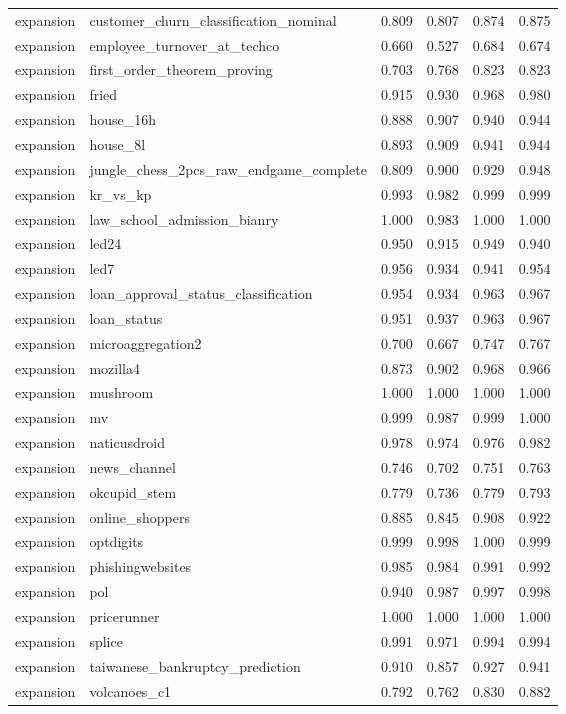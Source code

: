 \begin{longtable}{llrrrr}
expansion & customer\_churn\_classification\_nominal & 0.809 & 0.807 & 0.874 & 0.875 \\
expansion & employee\_turnover\_at\_techco & 0.660 & 0.527 & 0.684 & 0.674 \\
expansion & first\_order\_theorem\_proving & 0.703 & 0.768 & 0.823 & 0.823 \\
expansion & fried & 0.915 & 0.930 & 0.968 & 0.980 \\
expansion & house\_16h & 0.888 & 0.907 & 0.940 & 0.944 \\
expansion & house\_8l & 0.893 & 0.909 & 0.941 & 0.944 \\
expansion & jungle\_chess\_2pcs\_raw\_endgame\_complete & 0.809 & 0.900 & 0.929 & 0.948 \\
expansion & kr\_vs\_kp & 0.993 & 0.982 & 0.999 & 0.999 \\
expansion & law\_school\_admission\_bianry & 1.000 & 0.983 & 1.000 & 1.000 \\
expansion & led24 & 0.950 & 0.915 & 0.949 & 0.940 \\
expansion & led7 & 0.956 & 0.934 & 0.941 & 0.954 \\
expansion & loan\_approval\_status\_classification & 0.954 & 0.934 & 0.963 & 0.967 \\
expansion & loan\_status & 0.951 & 0.937 & 0.963 & 0.967 \\
expansion & microaggregation2 & 0.700 & 0.667 & 0.747 & 0.767 \\
expansion & mozilla4 & 0.873 & 0.902 & 0.968 & 0.966 \\
expansion & mushroom & 1.000 & 1.000 & 1.000 & 1.000 \\
expansion & mv & 0.999 & 0.987 & 0.999 & 1.000 \\
expansion & naticusdroid & 0.978 & 0.974 & 0.976 & 0.982 \\
expansion & news\_channel & 0.746 & 0.702 & 0.751 & 0.763 \\
expansion & okcupid\_stem & 0.779 & 0.736 & 0.779 & 0.793 \\
expansion & online\_shoppers & 0.885 & 0.845 & 0.908 & 0.922 \\
expansion & optdigits & 0.999 & 0.998 & 1.000 & 0.999 \\
expansion & phishingwebsites & 0.985 & 0.984 & 0.991 & 0.992 \\
expansion & pol & 0.940 & 0.987 & 0.997 & 0.998 \\
expansion & pricerunner & 1.000 & 1.000 & 1.000 & 1.000 \\
expansion & splice & 0.991 & 0.971 & 0.994 & 0.994 \\
expansion & taiwanese\_bankruptcy\_prediction & 0.910 & 0.857 & 0.927 & 0.941 \\
expansion & volcanoes\_c1 & 0.792 & 0.762 & 0.830 & 0.882 \\
\end{longtable}
